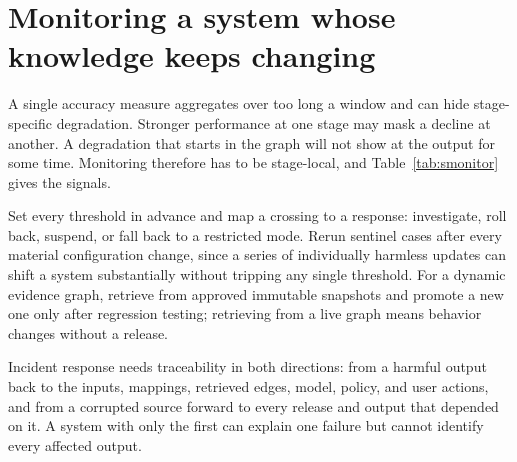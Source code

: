 \documentclass[10pt,a4paper]{article}
\begin{document}
\section{Monitoring a system whose knowledge keeps changing}
\label{s:monitoring}

A single accuracy measure aggregates over too long a window and can hide stage-specific degradation.
Stronger performance at one stage may mask a decline at another. A degradation that starts in the
graph will not show at the output for some time. Monitoring therefore has to be stage-local, and
Table~\ref{tab:smonitor} gives the signals.

Set every threshold in advance and map a crossing to a response: investigate, roll back, suspend, or
fall back to a restricted mode. Rerun
sentinel cases after every material configuration change, since a series of individually harmless
updates can shift a system substantially without tripping any single threshold. For a dynamic evidence
graph, retrieve from approved immutable snapshots and promote a new one only after regression testing;
retrieving from a live graph means behavior changes without a release.

Incident response needs traceability in both directions: from a harmful output back to the inputs,
mappings, retrieved edges, model, policy, and user actions, and from a corrupted source forward to
every release and output that depended on it. A system with only the first can explain one failure but
cannot identify every affected output.
\end{document}
